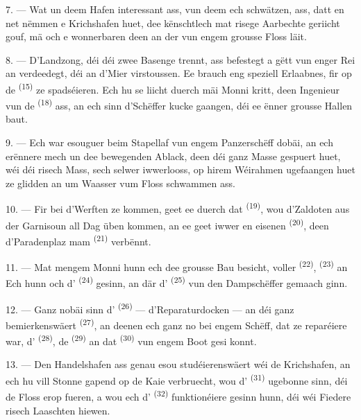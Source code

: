 7. --- Wat un deem Hafen interessant ass, vun deem ech schwätzen, ass, datt en net
nëmmen e Krichshafen huet, dee kënschtlech mat risege Aarbechte geriicht gouf, mä och
e wonnerbaren  deen an der  vun engem grousse
Floss läit.

8. --- D'Landzong, déi déi zwee Basenge trennt, ass befestegt a gëtt vun enger Rei
 an  verdeedegt, déi an d'Mier virstoussen. Ee
brauch eng speziell Erlaabnes, fir op de  \textsuperscript{(15)} ze
spadséieren. Ech hu se liicht duerch mäi Monni kritt, deen Ingenieur vun de
 \textsuperscript{(18)} ass, an ech sinn d'Schëffer kucke gaangen,
déi ee ënner grousse Hallen baut.

9. --- Ech war esouguer beim Stapellaf vun engem Panzerschëff dobäi, an ech erënnere
mech un dee bewegenden Ablack, deen déi ganz Masse gespuert huet, wéi déi risech
Mass, sech selwer iwwerlooss, op hirem Wéirahmen ugefaangen huet ze glidden an um
Waasser vum Floss schwammen ass.

10. --- Fir bei d'Werften ze kommen, geet ee duerch dat 
\textsuperscript{(19)}, wou d'Zaldoten aus der Garnisoun all Dag üben kommen, an ee
geet iwwer en eisenen  \textsuperscript{(20)}, deen d'Paradenplaz mam
 \textsuperscript{(21)} verbënnt.

\VUsaut{3.0mm}
\VUsaut{3.0mm}

11. --- Mat mengem Monni hunn ech dee grousse Bau besicht, voller 
\textsuperscript{(22)},  \textsuperscript{(23)} an 
Ech hunn och d' \textsuperscript{(24)} gesinn, an där
d' \textsuperscript{(25)} vun den Dampschëffer gemaach ginn.

12. --- Ganz nobäi sinn d' \textsuperscript{(26)} --- d'Reparaturdocken
--- an déi ganz bemierkenswäert  \textsuperscript{(27)}, an
deenen ech ganz no bei engem Schëff, dat ze reparéiere war, d'
\textsuperscript{(28)}, de  \textsuperscript{(29)} an dat
 \textsuperscript{(30)} vun engem Boot gesi konnt.

13. --- Den Handelshafen ass genau esou studéierenswäert wéi de Krichshafen, an ech
hu vill Stonne gapend op de Kaie verbruecht, wou d'
\textsuperscript{(31)} ugebonne sinn, déi de Floss erop fueren, a wou ech
d' \textsuperscript{(32)} funktionéiere gesinn hunn, déi wéi
Fiedere risech Laaschten hiewen.

